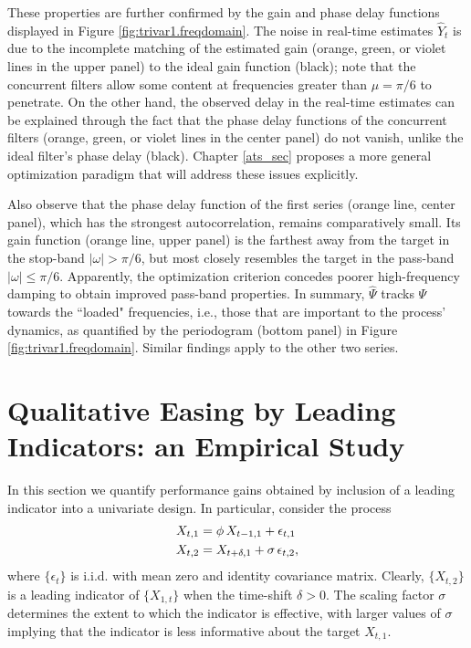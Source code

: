 \documentclass[a4paper]{book}
\begin{document}
 These properties are further confirmed by the gain and phase delay
 functions displayed   in Figure \ref{fig:trivar1.freqdomain}.   
 The noise  in real-time estimates $\widehat{Y}_t$  
 is due to the incomplete matching of the estimated gain (orange, green, or
 violet lines in the upper panel) to the ideal gain function (black); 
  note that the concurrent
 filters allow some   content at frequencies greater than $\mu = \pi/6$
 to penetrate.  On the other hand, the observed delay in the real-time
 estimates can be explained through the fact that the phase delay functions
 of the concurrent filters (orange, green, or
 violet lines in the center panel) do not vanish, unlike the ideal
 filter's phase delay (black).  
   Chapter \ref{ats_sec} 
proposes a more general optimization paradigm that will address these issues 
explicitly.

 Also observe that the phase delay function of the first series
 (orange line, center panel), which has the strongest autocorrelation,
  remains comparatively small. Its gain function (orange line, upper panel) 
 is the farthest away from the target in the stop-band $|\omega| >\pi/6$,
   but most closely resembles the target in the pass-band 
	$|\omega| \leq\pi/6$.
  Apparently,  the optimization criterion concedes
 poorer high-frequency damping to obtain improved pass-band properties. 
 In summary, $\widehat{\Psi}$ tracks $\Psi$ towards the ``loaded"
 frequencies, i.e., those that are important to the process'
 dynamics, as quantified by the periodogram (bottom panel) in 
 Figure \ref{fig:trivar1.freqdomain}.  
Similar findings apply to the other two series.




\section{Qualitative Easing by Leading Indicators: an Empirical Study}
   \label{leading_ind}

In this section we quantify performance gains 
  obtained by inclusion of a leading indicator into a univariate design.
 In particular, consider the process
\begin{align}
 X_{t,1} & = \phi \, X_{t-1,1} + \epsilon_{t,1} \notag \\
 X_{t,2} & = X_{t+\delta,1} + \sigma \, \epsilon_{t,2}, \label{def_led_i}
\end{align} 
  where $\{ \epsilon_t \}$ is i.i.d. with mean zero and identity covariance matrix.
  Clearly, $\{ X_{t,2} \}$ is a leading indicator of $\{ X_{1,t} \}$ when
 the time-shift  $\delta > 0$.   The scaling factor $\sigma$ determines  
 the extent to which the indicator is effective, with 
 larger values of  $\sigma$ implying that the indicator is less 
informative about the target $X_{t,1}$.
\end{document}

